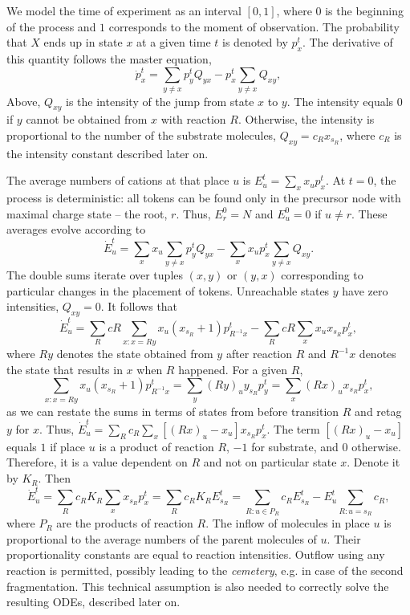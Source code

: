 \documentclass{llncs}
\begin{document}
We model the time of experiment as an interval $[0,1]$, where $0$ is the beginning of the process and $1$ corresponds to the moment of observation. The probability that $X$ ends up in state $x$ at a given time $t$ is denoted by $p_x^t$. The derivative of this quantity follows the master equation,
        $$\dot{p}_x^t = \sum_{y\not=x} p_y^t Q_{yx} - p_x^t \sum_{y\not=x} Q_{xy},$$
Above, $Q_{xy}$ is the intensity of the jump from state $x$ to $y$. The intensity equals $0$ if $y$ cannot be obtained from $x$ with reaction $R$. Otherwise, the intensity is proportional to the number of the substrate molecules, $Q_{xy}=c_R x_{s_R}$,  where $c_R$ is the intensity constant described later on.

The average numbers of cations at that place $u$ is $E_u^t= \sum_x x_up_x^t$.
At $t=0$, the process is deterministic: all tokens can be found only in the precursor node with maximal charge state -- the root, $r$.
Thus, $E_r^0=N$ and $E_u^0=0$ if $u \not= r$.
These averages evolve according to
        $$\dot E_u^t=\sum_x x_u \sum_{y\not=x} p_y^t Q_{yx} -\sum_x x_u p_x^t \sum_{y\not=x} Q_{xy}.$$
The double sums iterate over tuples $(x,y)$ or $(y,x)$ corresponding to particular changes in the placement of tokens.
Unreachable states $y$ have zero intensities, $Q_{xy} = 0$.
It follows that
        $$\dot E_u^t = \sum_R cR \sum_{x:x=Ry}  x_u (x_{s_R}+1) p_{R^{-1}x}^t- \sum_R cR \sum_{x} x_u x_{s_R} p_x^t,$$
where $Ry$ denotes the state obtained from $y$ after reaction $R$ and $R^{-1}x$ denotes the state that results in $x$ when $R$ happened. For a given $R$,
        $$\sum_{x:x=Ry} x_u (x_{s_R}+1) p_{R^{-1}x}^t = \sum_{y}  (Ry)_u y_{s_R} p_y^t = \sum_x (Rx)_u x_{s_R} p_x^t,$$
as we can restate the sums in terms of states from before transition $R$ and retag $y$ for $x$.
Thus, $\dot E_u^t = \sum_R c_R \sum_x   \left[(Rx)_u-x_u \right] x_{s_R} p_x^t$. The term $\left[(Rx)_u-x_u\right]$ equals $1$ if place $u$ is a product of reaction $R$, $-1$ for substrate, and $0$ otherwise.
Therefore, it is a value dependent on $R$ and not on particular state $x$.
Denote it by $K_R$.
Then
        $$\dot E_u^t = \sum_R c_R K_R \sum_x x_{s_R} p_x^t = \sum_R c_R K_R E_{s_R}^t = \sum_{R:u\in P_R} c_R E_{s_R}^t - E_u^t \sum_{R: u=s_R}c_R,$$
where $P_R$ are the products of reaction $R$.
The inflow of molecules in place $u$ is proportional to the average numbers of the parent molecules of $u$.
Their proportionality constants are equal to reaction intensities.
Outflow using any reaction is permitted, possibly leading to the \textit{cemetery}, e.g. in case of the second fragmentation. This technical assumption is also needed to correctly solve the resulting ODEs, described later on.
\end{document}
